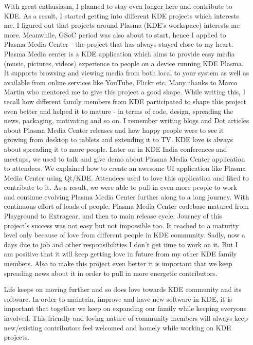 With great enthusiasm, I planned to stay even longer here and contribute to KDE. As a result, I started getting into different KDE projects which interests me. I figured out that projects around Plasma (KDE’s workspace) interests me more. Meanwhile, GSoC period was also about to start, hence I applied to Plasma Media Center - the project that has always stayed close to my heart. Plasma Media center is a KDE application which aims to provide easy media (music, pictures, videos) experience to people on a device running KDE Plasma. It supports browsing and viewing media from both local to your system as well as available from online services like YouTube, Flickr etc. Many thanks to Marco Martin who mentored me to give this project a good shape. While writing this, I recall how different family members from KDE participated to shape this project even better and helped it to mature - in terms of code, design, spreading the news, packaging, motivating and so on. I remember writing blogs and Dot articles about Plasma Media Center releases and how happy people were to see it growing from desktop to tablets and extending it to TV. KDE love is always about spreading it to more people. Later on in KDE India conferences and meetups, we used to talk and give demo about Plasma Media Center application to attendees. We explained how to create an awesome UI application like Plasma Media Center using Qt/KDE. Attendees used to love this application and liked to contribute to it. As a result, we were able to pull in even more people to work and continue evolving Plasma Media Center further along to a long journey. With continuous effort of loads of people, Plasma Media Center codebase matured from Playground to Extragear, and then to main release cycle. Journey of this project’s success was not easy but not impossible too. It reached to a maturity level only because of love from different people in KDE community. Sadly, now a days due to job and other responsibilities I don’t get time to work on it. But I am positive that it will keep getting love in future from my other KDE family members. Also to make this project even better it is important that we keep spreading news about it in order to pull in more energetic contributors.

Life keeps on moving further and so does love towards KDE community and its software. In order to maintain, improve and have new software in KDE, it is important that together we keep on expanding our family while keeping everyone involved. This friendly and loving nature of community members will always keep new/existing contributors feel welcomed and homely while working on KDE projects.